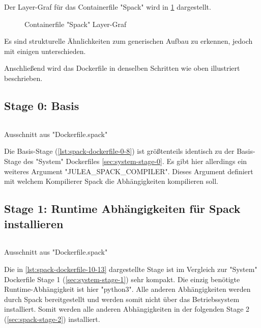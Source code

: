 Der Layer-Graf für das Containerfile "Spack" wird in \cref{fig:spack-layer-graph} dargestellt.
\begin{figure}[!htbp]
    \centering
    
    \caption{Containerfile "Spack" Layer-Graf}
    \label{fig:spack-layer-graph}
\end{figure}

Es sind strukturelle Ähnlichkeiten zum generischen Aufbau zu erkennen, jedoch mit einigen unterschieden. 

Anschließend wird das Dockerfile in denselben Schritten wie oben illustriert beschrieben.

\subsection{Stage 0: Basis}

\begin{listing}[H]
    \inputminted[firstline=0,lastline=8]{dockerfile}{./code-examples/Dockerfile.spack}
    \caption{Ausschnitt aus "Dockerfile.spack"}
    \label{lst:spack-dockerfile-0-8}
\end{listing}

Die Basis-Stage (\cref{lst:spack-dockerfile-0-8}) ist größtenteils identisch zu der Basis-Stage des "System" Dockerfiles \cref{sec:system-stage-0}. Es gibt hier allerdings ein weiteres Argument "JULEA\_SPACK\_COMPILER". Dieses Argument definiert mit welchem Kompilierer Spack die Abhängigkeiten kompilieren soll. 

\subsection{Stage 1: Runtime Abhängigkeiten für Spack installieren}

\begin{listing}[H]
    \inputminted[firstline=10,lastline=13]{dockerfile}{./code-examples/Dockerfile.spack}
    \caption{Ausschnitt aus "Dockerfile.spack"}
    \label{lst:spack-dockerfile-10-13}
\end{listing}

Die in \cref{lst:spack-dockerfile-10-13} dargestellte Stage ist im Vergleich zur "System" Dockerfile Stage 1 (\cref{sec:system-stage-1}) sehr kompakt.
Die einzig benötigte Runtime-Abhängigkeit ist hier "python3". Alle anderen Abhängigkeiten werden durch Spack bereitgestellt und werden somit nicht über das Betriebssystem installiert. Somit werden alle anderen Abhängigkeiten in der folgenden Stage 2 (\cref{sec:spack-stage-2}) installiert.  

